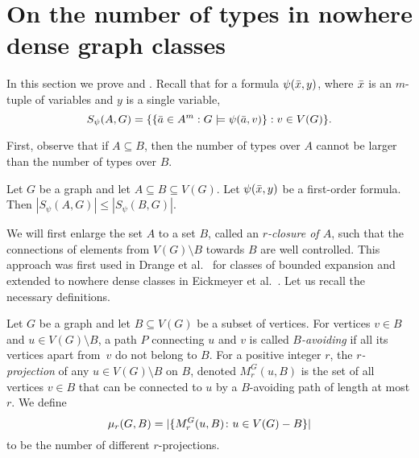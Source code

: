 \section{On the number of types in nowhere dense graph classes}

In this section we prove  and . Recall that for a
formula $\psi(\bar{x},y)$, where 
$\bar{x}$ is an $m$-tuple of variables and $y$ is a single variable, 
\[S_\psi(A,G)=\{\{\bar{a} \in A^m : G\models\psi(\bar{a},v)\} : v\in V(G)\}.\]

First, observe that if $A\subseteq B$, then the number of types
over $A$ cannot be larger than the number of types over $B$. 

\begin{lemma}\label{lem:types-over-B}
Let $G$ be a graph and let $A\subseteq B\subseteq V(G)$. Let 
$\psi(\bar{x},y)$ be a first-order formula. Then 
$|S_\psi(A,G)|\leq |S_\psi(B,G)|$. 
\end{lemma}

We will first enlarge the set $A$ to a set $B$, called
an \emph{$r$-closure of $A$}, such 
that the connections of elements from $V(G)\setminus B$ 
towards $B$ are well controlled. This approach
was first used in Drange et al.~\cite{drange2016kernelization} for
classes of bounded expansion and extended to nowhere dense
classes in Eickmeyer et al.~\cite{eickmeyer2016neighborhood}. 
Let us recall the necessary definitions.

Let $G$ be a graph and let $B\subseteq V(G)$ be a subset of vertices. For vertices $v\in B$ and $u\in V(G)\setminus B$, a path $P$ connecting $u$ and $v$ is called {\em{$B$-avoiding}}
if all its vertices apart from~$v$ do not belong to $B$. For a positive integer $r$, the {\em{$r$-projection}} of any $u\in V(G)\setminus B$ on $B$, denoted $M^G_r(u,B)$ is the set of all vertices $v\in B$ that
can be connected to $u$ by a $B$-avoiding path of length at most $r$. 
%
%
We define 
\[\mu_r(G,B)=|\{M_r^G(u,B)\colon u\in V(G)- B\}|\]
to be the number of different $r$-projections.

